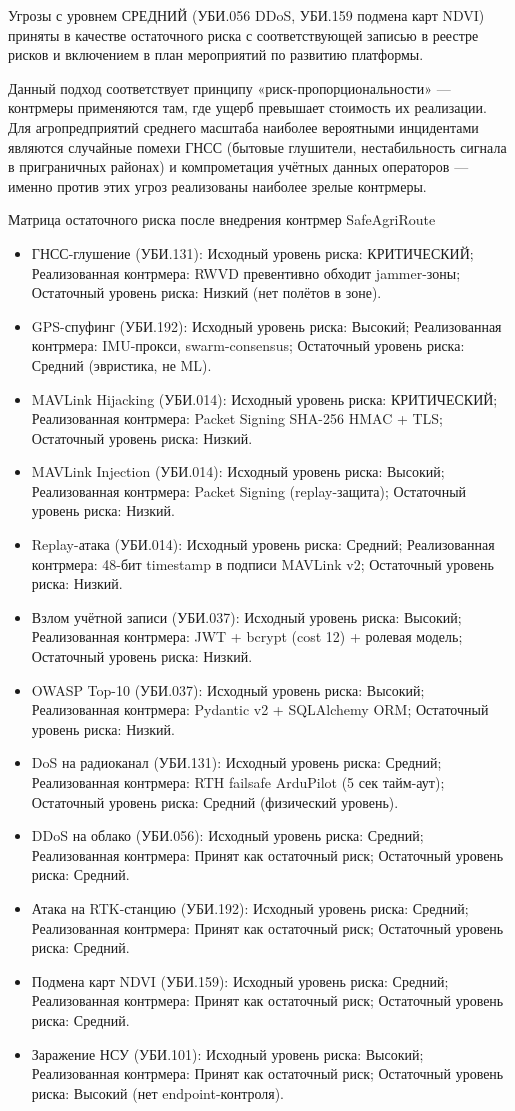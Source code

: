 \documentclass[14pt,a4paper]{extarticle}
\begin{document}
Угрозы с уровнем СРЕДНИЙ (УБИ.056 DDoS, УБИ.159 подмена карт NDVI) приняты в качестве остаточного риска с соответствующей записью в реестре рисков и включением в план мероприятий по развитию платформы.

Данный подход соответствует принципу «риск-пропорциональности» --- контрмеры применяются там, где ущерб превышает стоимость их реализации. Для агропредприятий среднего масштаба наиболее вероятными инцидентами являются случайные помехи ГНСС (бытовые глушители, нестабильность сигнала в приграничных районах) и компрометация учётных данных операторов --- именно против этих угроз реализованы наиболее зрелые контрмеры.

Матрица остаточного риска после внедрения контрмер SafeAgriRoute
\begin{itemize}
\item ГНСС-глушение (УБИ.131): Исходный уровень риска: КРИТИЧЕСКИЙ; Реализованная контрмера: RWVD превентивно обходит jammer-зоны; Остаточный уровень риска: Низкий (нет полётов в зоне).
\item GPS-спуфинг (УБИ.192): Исходный уровень риска: Высокий; Реализованная контрмера: IMU-прокси, swarm-consensus; Остаточный уровень риска: Средний (эвристика, не ML).
\item MAVLink Hijacking (УБИ.014): Исходный уровень риска: КРИТИЧЕСКИЙ; Реализованная контрмера: Packet Signing SHA-256 HMAC + TLS; Остаточный уровень риска: Низкий.
\item MAVLink Injection (УБИ.014): Исходный уровень риска: Высокий; Реализованная контрмера: Packet Signing (replay-защита); Остаточный уровень риска: Низкий.
\item Replay-атака (УБИ.014): Исходный уровень риска: Средний; Реализованная контрмера: 48-бит timestamp в подписи MAVLink v2; Остаточный уровень риска: Низкий.
\item Взлом учётной записи (УБИ.037): Исходный уровень риска: Высокий; Реализованная контрмера: JWT + bcrypt (cost 12) + ролевая модель; Остаточный уровень риска: Низкий.
\item OWASP Top-10 (УБИ.037): Исходный уровень риска: Высокий; Реализованная контрмера: Pydantic v2 + SQLAlchemy ORM; Остаточный уровень риска: Низкий.
\item DoS на радиоканал (УБИ.131): Исходный уровень риска: Средний; Реализованная контрмера: RTH failsafe ArduPilot (5 сек тайм-аут); Остаточный уровень риска: Средний (физический уровень).
\item DDoS на облако (УБИ.056): Исходный уровень риска: Средний; Реализованная контрмера: Принят как остаточный риск; Остаточный уровень риска: Средний.
\item Атака на RTK-станцию (УБИ.192): Исходный уровень риска: Средний; Реализованная контрмера: Принят как остаточный риск; Остаточный уровень риска: Средний.
\item Подмена карт NDVI (УБИ.159): Исходный уровень риска: Средний; Реализованная контрмера: Принят как остаточный риск; Остаточный уровень риска: Средний.
\item Заражение НСУ (УБИ.101): Исходный уровень риска: Высокий; Реализованная контрмера: Принят как остаточный риск; Остаточный уровень риска: Высокий (нет endpoint-контроля).
\end{itemize}
\end{document}
